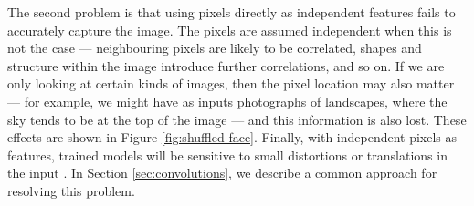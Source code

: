         The second problem is that using pixels directly as independent features
        fails to accurately capture the image. The pixels are assumed
        independent when this is not the case --- neighbouring pixels are likely
        to be correlated, shapes and structure within the image introduce
        further correlations, and so on. If we are only looking at certain kinds
        of images, then the pixel location may also matter --- for example, we
        might have as inputs photographs of landscapes, where the sky tends to
        be at the top of the image --- and this information is also lost. These
        effects are shown in Figure \ref{fig:shuffled-face}. Finally, with independent pixels as features, trained models will be sensitive to small distortions or translations in the input \citep{lecun98}. In Section
        \ref{sec:convolutions}, we describe a common approach for resolving this
        problem.

